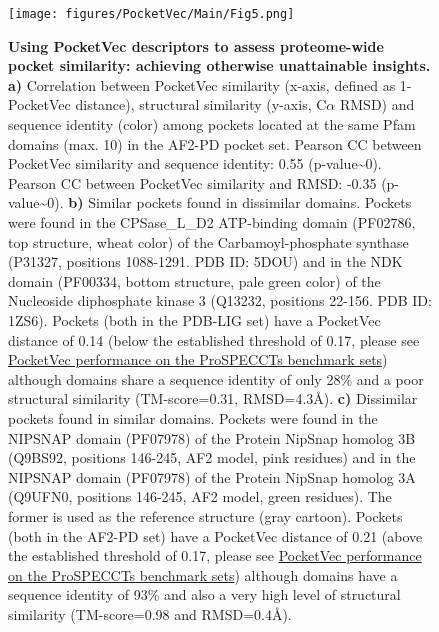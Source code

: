
\begin{figure}[H]
  \centering
  \texttt{[image: figures/PocketVec/Main/Fig5.png]} 
  \caption{
    \textbf{Using PocketVec descriptors to assess proteome-wide pocket similarity: achieving otherwise unattainable insights.} 
    \textbf{a)} Correlation between PocketVec similarity (x-axis, defined as 1-PocketVec distance), structural similarity (y-axis, C$\alpha$ RMSD) and sequence identity (color) among pockets located at the same Pfam domains (max. 10) in the AF2-PD pocket set. Pearson CC between PocketVec similarity and sequence identity: 0.55 (p-value\textasciitilde0). Pearson CC between PocketVec similarity and RMSD: -0.35 (p-value\textasciitilde0).
    \textbf{b)} Similar pockets found in dissimilar domains. Pockets were found in the CPSase\_L\_D2 ATP-binding domain (PF02786, top structure, wheat color) of the Carbamoyl-phosphate synthase (P31327, positions 1088-1291. PDB ID: 5DOU) and in the NDK domain (PF00334, bottom structure, pale green color) of the Nucleoside diphosphate kinase 3 (Q13232, positions 22-156. PDB ID: 1ZS6). Pockets (both in the PDB-LIG set) have a PocketVec distance of 0.14 (below the established threshold of 0.17, please see \hyperref[PocketVec_ResultsAndDiscussion_PocketVec_performance_on_the_ProSPECCTs_benchmark]{PocketVec performance on the ProSPECCTs benchmark sets}) although domains share a sequence identity of only 28\% and a poor structural similarity (TM-score=0.31, RMSD=4.3Å).
    \textbf{c)} Dissimilar pockets found in similar domains. Pockets were found in the NIPSNAP domain (PF07978) of the Protein NipSnap homolog 3B (Q9BS92, positions 146-245, AF2 model, pink residues) and in the NIPSNAP domain (PF07978) of the Protein NipSnap homolog 3A (Q9UFN0, positions 146-245, AF2 model, green residues). The former is used as the reference structure (gray cartoon). Pockets (both in the AF2-PD set) have a PocketVec distance of 0.21 (above the established threshold of 0.17, please see \hyperref[PocketVec_ResultsAndDiscussion_PocketVec_performance_on_the_ProSPECCTs_benchmark]{PocketVec performance on the ProSPECCTs benchmark sets}) although domains have a sequence identity of 93\% and also a very high level of structural similarity (TM-score=0.98 and RMSD=0.4Å).
  }
  \label{PocketVec_Fig5}
\end{figure}





